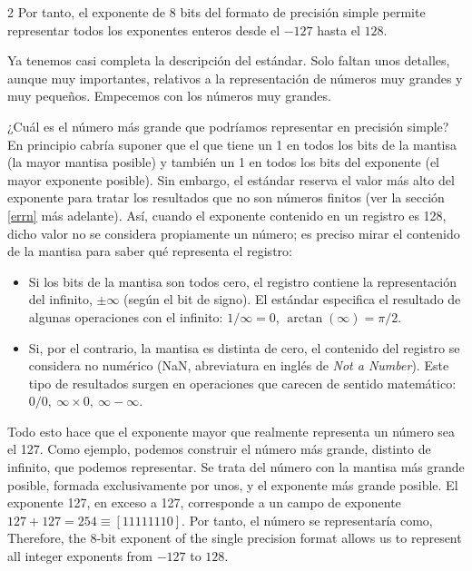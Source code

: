\begin{paracol}{2}
Por tanto, el exponente de 8 bits del formato de precisión simple permite representar todos los exponentes enteros desde el $-127$ hasta el $128$.

Ya tenemos casi completa la descripción del estándar. Solo faltan unos detalles, aunque muy importantes, relativos a la representación de números muy grandes y muy pequeños. Empecemos con los números muy grandes.

¿Cuál es el número más grande que podría\-mos representar en precisión simple? En principio cabría suponer que el que tiene un 1 en todos los bits de la mantisa (la mayor mantisa posible) y también un 1 en todos los bits del exponente (el mayor exponente posible). Sin embargo, el están\-dar reserva el valor más alto del exponente para tratar los resultados que no son números finitos (ver la sección \ref{errn} más adelante). Así, cuando el exponente contenido en un registro es 128, dicho valor no se considera propiamente un número; es preciso mirar el contenido de la mantisa para saber qué representa el registro:

\begin{itemize}
\item Si los bits de la mantisa son todos cero, el registro contiene la representación del infinito, $\pm\infty$ (según el bit de signo). El estándar especifica el resultado de algunas operaciones con el infinito: $1/\infty=0$, $\arctan(\infty)=\pi/2$.

\item {}  Si, por el contrario, la mantisa es distinta de cero, el contenido del registro se considera no numérico (NaN, abreviatura en inglés de \emph{Not a Number}). Este tipo de resultados surgen en operaciones que carecen de sentido matemático: $0/0, \ \infty\times0,\ \infty -\infty$.
\end{itemize}

Todo esto hace que el exponente mayor que realmente representa un número sea el 127.  Como ejemplo, podemos construir el número más grande, distinto de infinito, que podemos representar. Se trata del número con la mantisa más grande posible, formada exclusivamente por unos, y el exponente más grande posible. El exponente 127, en exceso a 127, corresponde a un campo de exponente $127+127=254 \equiv [11111110]$. Por tanto, el número se representaría como,
\switchcolumn
Therefore, the 8-bit exponent of the single precision format allows us to represent all integer exponents from $-127$ to $128$.


\end{paracol}
